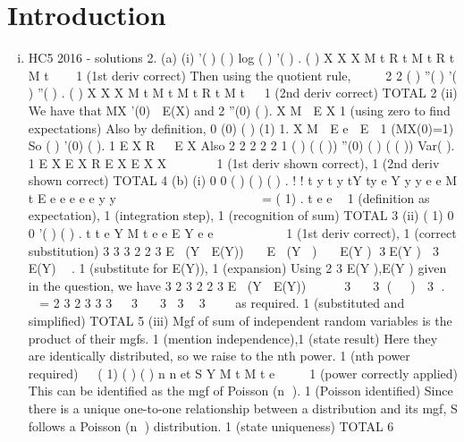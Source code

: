 \documentclass{article}
\author{kobriendublin }
\date{December 2018}
\begin{document}
\section{Introduction}
\begin{enumerate}[(i)]
\item HC5 2016 - solutions
2. (a) (i)
'( )
( ) log ( ) '( ) .
( )
X
X
X
M t
R t M t R t
M t
   1 (1st deriv correct)
Then using the quotient rule,
 
 
2
2
( ) ''( ) '( )
''( ) .
( )
X X
X
M t M t M t
R t
M t

 1 (2nd deriv correct)
TOTAL 2
(ii) We have that MX '(0)  E(X) and 2 ''(0) ( ). X M  E X 1 (using zero to find expectations)
Also by definition, 0 (0) ( ) (1) 1. X M  E e  E  1 (MX(0)=1)
So
( )
'(0) ( ).
1
E X
R   E X Also
2 2
2 2
2
1 ( ) ( ( ))
''(0) ( ) ( ( )) Var( ).
1
E X E X
R E X E X X
 
   
1 (1st deriv shown correct), 1 (2nd deriv shown correct)
TOTAL 4
(b) (i)
0 0
( )
( ) ( ) .
! !
t
y t y
tY ty e
Y
y y
e e
M t E e e e e e
y y

       
 
 
     = ( 1) .
t e e 
1 (definition as expectation), 1 (integration step),
1 (recognition of sum)
TOTAL 3
(ii) ( 1) 0 0 '( ) ( ) .
t t e
Y M t e e E Y e e          1 (1st deriv correct), 1 (correct substitution)
3 3 3 2 2 3 E (Y  E(Y))   E (Y )   E(Y ) 3E(Y )  3 E(Y)  .
1 (substitute for E(Y)), 1 (expansion)
Using 2 3 E(Y ),E(Y ) given in the question, we have
3 2 3 2 2 3 E (Y  E(Y))     3  3 (  )  3 . 
= 2 3 2 3 3 3   3  3 3  3   as required.
1 (substituted and simplified)
TOTAL 5
(iii) Mgf of sum of independent random variables is the product of their mgfs.
1 (mention independence),1 (state result)
Here they are identically distributed, so we raise to the nth power. 1 (nth power required)
  ( 1) ( ) ( )
n n et
S Y M t M t e     1 (power correctly applied)
This can be identified as the mgf of Poisson (n ). 1 (Poisson identified)
Since there is a unique one-to-one relationship between a distribution and its mgf, S follows a
Poisson (n ) distribution. 1 (state uniqueness)
TOTAL 6
\end{enumerate}
\end{document}
